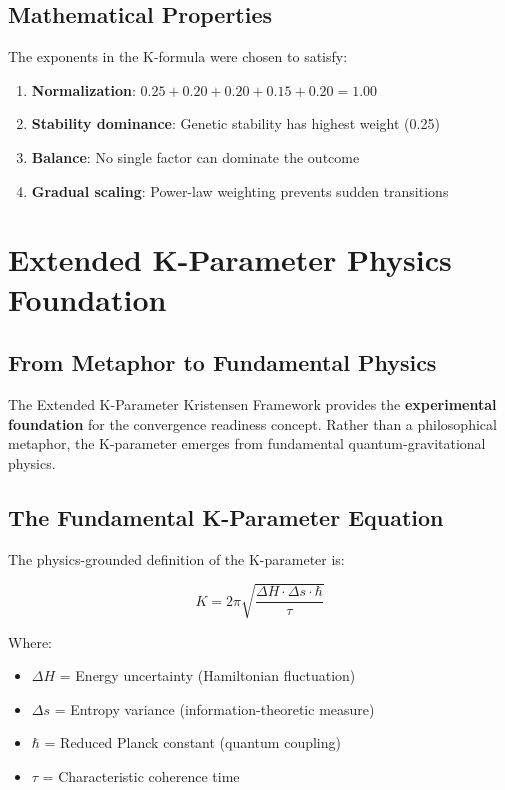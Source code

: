 \documentclass[12pt,a4paper]{article}
\begin{document}
\subsection{Mathematical Properties}

The exponents in the K-formula were chosen to satisfy:
\begin{enumerate}
    \item \textbf{Normalization}: $0.25 + 0.20 + 0.20 + 0.15 + 0.20 = 1.00$
    \item \textbf{Stability dominance}: Genetic stability has highest weight (0.25)
    \item \textbf{Balance}: No single factor can dominate the outcome
    \item \textbf{Gradual scaling}: Power-law weighting prevents sudden transitions
\end{enumerate}

\section{Extended K-Parameter Physics Foundation}

\subsection{From Metaphor to Fundamental Physics}

The Extended K-Parameter Kristensen Framework provides the \textbf{experimental foundation}
for the convergence readiness concept. Rather than a philosophical metaphor, the K-parameter
emerges from fundamental quantum-gravitational physics.

\subsection{The Fundamental K-Parameter Equation}

The physics-grounded definition of the K-parameter is:

\begin{equation}
\boxed{
K = 2\pi\sqrt{\frac{\Delta H \cdot \Delta s \cdot \hbar}{\tau}}
}
\end{equation}

Where:
\begin{itemize}
    \item $\Delta H$ = Energy uncertainty (Hamiltonian fluctuation)
    \item $\Delta s$ = Entropy variance (information-theoretic measure)
    \item $\hbar$ = Reduced Planck constant (quantum coupling)
    \item $\tau$ = Characteristic coherence time
\end{itemize}
\end{document}
